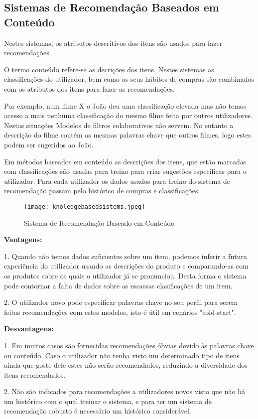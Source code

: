 \hfill
\subsection{Sistemas de Recomendação Baseados em Conteúdo}
\hfill
\par Nestes sistemas, os atributos descritivos dos itens são usados para fazer recomendações.
\par O termo conteúdo refere-se as decrições dos itens. Nestes sistemas as classificações do utilizador, bem como os seus hábitos de compras são combinados com os atributos dos itens para fazer as recomendações. 
\par Por exemplo, num filme X o João deu uma classificação elevada mas não temos acesso a mais nenhuma classificação do mesmo filme feita por outros utilizadores. Nestas situações Modelos de filtros colaborativos não servem. No entanto a descrição do filme contém as mesmas palavras chave que outros filmes, logo estes podem ser sugeridos ao João.
\par Em métodos baseados em conteúdo as descrições dos itens, que estão marcadas com classificações são usadas para treino para criar sugestões especificas para o utilizador. Para cada utilizador os dados usados para treino do sistema de recomendação passam pelo histórico de compras e classificações.\newline


\begin{figure}[H]
  \centering
    \texttt{[image: knoledgebasedsistems.jpeg]}
    \caption{Sistema de Recomendação Baseado em Conteúdo}
    \label{fig03}
\end{figure}

\textbf{Vantagens:}\hfill
\hfill
\par 1. Quando não temos dados suficientes sobre um item, podemos inferir a futura experiência do utilizador usando as descrições do produto e comparando-as com os produtos sobre os quais o utilizador já se pronunciou. Desta forma o sistema pode contornar a falta de dados sobre as escassas clasificações de um item.\newline
\hfill
\par 2. O utilizador novo pode especificar palavras chave no seu perfil para serem feitas recomendações com estes modelos, isto é útil em cenários "cold-start".\newline

\textbf{Desvantagens:}\hfill
\hfill
\par 1. Em muitos casos são fornecidas recomendações óbvias devido às palavras chave ou conteúdo. Caso o utilizador não tenha visto um determinado tipo de itens ainda que goste dele estes não serão recomendados, reduzindo a diversidade dos itens recomendados.\newline
\hfill
\par 2. Não são indicados para recomendações a utilizadores novos visto que não há um histórico com o qual treinar o sistema, e para ter um sistema de recomendação robusto é necessário um histórico considerável.\newline


